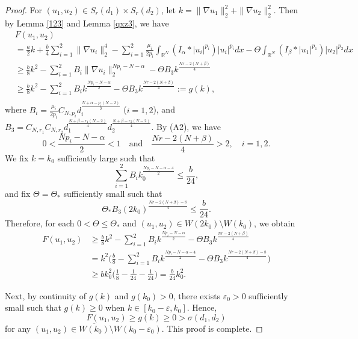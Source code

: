 \documentclass[10pt,a4paper]{amsart}
\numberwithin{equation}{section}
\begin{document}
\begin{proof}
For  $(u_1,u_2)\in S_r(d_1)\times S_r(d_2)$, 
let $k=\| \nabla u_1\|_2^2+\| \nabla u_2\|_2^2$. Then
by Lemma \ref{123} and Lemma \ref{qxz3}, we have
\begin{equation}\label{dmk7}
\begin{aligned}
&F(u_1,u_2) \\
&=\frac{a}{2}k+\frac{b}{4}\sum_{i=1}^2\| \nabla u_i\|_2^4-
\sum_{i=1}^2\frac{\mu_i}{2p_i}\int_{\mathbb{R}^N}
 (I_\alpha\ast|u_i|^{p_i})|u_i|^{p_i}dx-\Theta\int_{\mathbb{R}^N}
 (I_\beta\ast|u_1|^{p_1})|u_2|^{p_2}dx\\
&\geq \frac{b}{8}k^2-\sum_{i=1}^2B_i\| \nabla u_i\|_2^{Np_i-N-\alpha}
 -\Theta B_3k^{\frac{Nr-2(N+\beta)}{4}}\\
&\geq \frac{b}{8}k^2-\sum_{i=1}^2B_ik^{\frac{Np_i-N-\alpha}{2}}
 -\Theta B_3k^{\frac{Nr-2(N+\beta)}{4}}:=g(k),\\
\end{aligned}
\end{equation}
where $B_i=\frac{\mu_i}{2p_i}C_{N,p_i}d_i^{\frac{N+\alpha-p_i(N-2)}{2}}$ ($i=1,2$), 
and $B_3=C_{N,r_1}C_{N,r_2}d_1^{\frac{N+\beta-r_1(N-2)}{4}}
d_2^{\frac{N+\beta-r_2(N-2)}{4}}$.
By (A2), we have
\[
0<\frac{Np_i-N-\alpha}{2}<1 \quad \text{and}\quad
  \frac{Nr-2(N+\beta)}{4}>2, \quad i=1,2.
\]
We fix $k=k_0$ sufficiently large such that
\[
\sum_{i=1}^2B_ik_0^{\frac{Np_i-N-\alpha-4}{2}}\leq\frac{b}{24},
\]
and fix $\Theta=\Theta_*$ sufficiently small such that
\[
\Theta_*B_3(2k_0)^{\frac{Nr-2(N+\beta)-8}{4}}\leq\frac{b}{24}.
\]
Therefore, for each $0<\Theta\leq\Theta_*$ and
$(u_1,u_2)\in W(2k_0)\setminus W(k_0)$,
we obtain
\begin{align*}
F(u_1,u_2)
&\geq \frac{b}{8}k^2-\sum_{i=1}^2B_ik^{\frac{Np_i-N-\alpha}{2}}
 -\Theta B_3k^{\frac{Nr-2(N+\beta)}{4}}\\
&= k^2\Big(\frac{b}{8}-\sum_{i=1}^2B_ik^{\frac{Np_i-N-\alpha-4}{2}}
 -\Theta B_3k^{\frac{Nr-2(N+\beta)-8}{4}}\Big)\\
&\geq bk_0^2\Big(\frac{1}{8}-\frac{1}{24}-\frac{1}{24}\Big)
=\frac{b}{24}k_0^2.
\end{align*}

Next, by continuity of $g(k)$ and $g(k_0)>0$, there exists $\varepsilon_0>0$ 
sufficiently small such that $g(k)\geq0$ when $k\in[k_0-\varepsilon,k_0]$. Hence,
\[
F(u_1,u_2)\geq g(k)\geq0>\sigma(d_1,d_2)
\]
for any $(u_1,u_2)\in\overline{W(k_0)}\setminus W(k_0-\varepsilon_0)$.
This proof is complete.
\end{proof}
\end{document}
